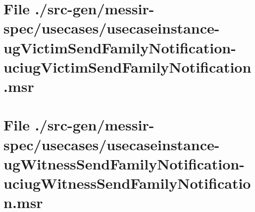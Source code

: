 \section[File /.../usecaseinstance-ugVictimSendFamilyNotification-uciugVictimSendFamilyNotification.msr]{File ./src-gen/messir-spec/usecases/usecaseinstance-ugVictimSendFamilyNotification-uciugVictimSendFamilyNotification.msr}
\scriptsize

\normalsize
	
\section[File /.../usecaseinstance-ugWitnessSendFamilyNotification-uciugWitnessSendFamilyNotification.msr]{File ./src-gen/messir-spec/usecases/usecaseinstance-ugWitnessSendFamilyNotification-uciugWitnessSendFamilyNotification.msr}
\scriptsize

\normalsize
	
